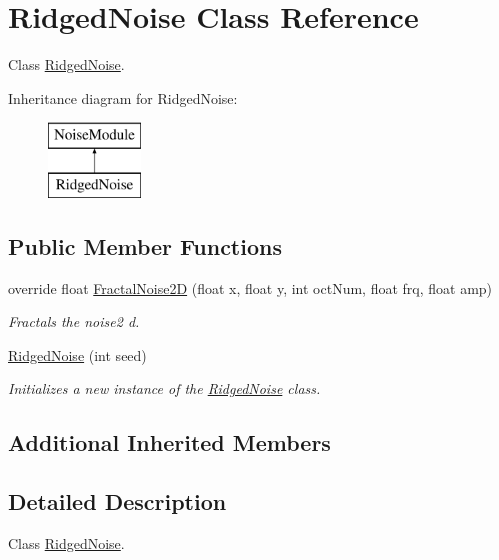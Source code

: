\hypertarget{class_ridged_noise}{}\section{Ridged\+Noise Class Reference}
\label{class_ridged_noise}


Class \hyperlink{class_ridged_noise}{Ridged\+Noise}.  


Inheritance diagram for Ridged\+Noise\+:\begin{figure}[H]
\begin{center}
\leavevmode
\includegraphics[height=2.000000cm]{class_ridged_noise}
\end{center}
\end{figure}
\subsection*{Public Member Functions}
\begin{DoxyCompactItemize}
\item 
override float \hyperlink{class_ridged_noise_ae7d0d5d2eecc5305930c8d2f166d39f7}{Fractal\+Noise2D} (float x, float y, int oct\+Num, float frq, float amp)
\begin{DoxyCompactList}\small\item\em Fractals the noise2 d. \end{DoxyCompactList}\item 
\hyperlink{class_ridged_noise_afd86e70bc7f353a07ca8d2c58c94578d}{Ridged\+Noise} (int seed)
\begin{DoxyCompactList}\small\item\em Initializes a new instance of the \hyperlink{class_ridged_noise}{Ridged\+Noise} class. \end{DoxyCompactList}\end{DoxyCompactItemize}
\subsection*{Additional Inherited Members}


\subsection{Detailed Description}
Class \hyperlink{class_ridged_noise}{Ridged\+Noise}. 



